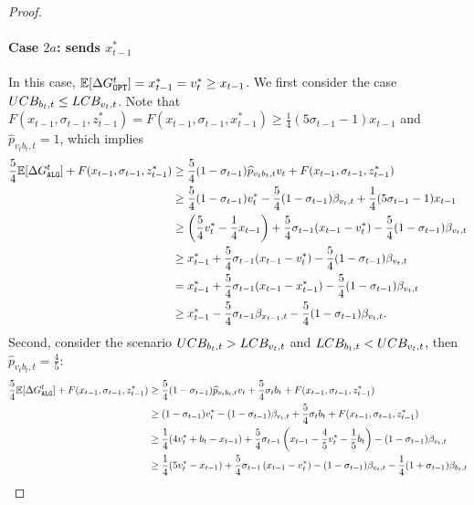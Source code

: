 \begin{proof}
    \paragraph{Case $2a$: \opt sends $x_{t-1}^*$}
    In this case, $\mathbb{E}[\Delta \Gopt^t] = x_{t-1}^* = v_t^* \ge x_{t-1}$. We first consider the case $UCB_{b_t, t} \le LCB_{v_{t},t}$. Note that $F(x_{t-1}, \sigma_{t-1}, z_{t-1}^*) = F(x_{t-1}, \sigma_{t-1}, x_{t-1}^*) \ge \frac{1}{4}(5\sigma_{t-1}-1)x_{t-1}$ and $\widehat{p}_{v_{t} b_t, t} = 1$, which implies
    \begin{align*}
        \frac{5}{4}\mathbb{E}[\Delta \Galg^t] + F(x_{t-1}, \sigma_{t-1}, z_{t-1}^*) &\ge \frac{5}{4}(1-\sigma_{t-1})\widehat{p}_{v_{t} b_t, t}v_{t} + F(x_{t-1}, \sigma_{t-1}, z_{t-1}^*) \\
        &\ge \frac{5}{4}(1-\sigma_{t-1})v_{t}^*- \frac{5}{4}(1-\sigma_{t-1})\beta_{v_t, t}+ \frac{1}{4}(5\sigma_{t-1}-1)x_{t-1} \\
        &\ge \left(\frac{5}{4}v_{t}^*-\frac{1}{4}x_{t-1}\right)+ \frac{5}{4}\sigma_{t-1}(x_{t-1}-v_t^*) - \frac{5}{4}(1-\sigma_{t-1})\beta_{v_t, t}\\
        &\ge x_{t-1}^*+ \frac{5}{4}\sigma_{t-1}(x_{t-1}-v_t^*) - \frac{5}{4}(1-\sigma_{t-1})\beta_{v_t, t}\\
        &= x_{t-1}^*+ \frac{5}{4}\sigma_{t-1}(x_{t-1}-x_{t-1}^*) - \frac{5}{4}(1-\sigma_{t-1})\beta_{v_t, t}\\
        &\ge x_{t-1}^*- \frac{5}{4}\sigma_{t-1}\beta_{x_{t-1},t}- \frac{5}{4}(1-\sigma_{t-1})\beta_{v_t, t}.
    \end{align*}
    Second, consider the scenario $UCB_{b_t, t} > LCB_{v_{t},t}$ and $LCB_{b_t, t} < UCB_{v_{t},t}$, then $\widehat{p}_{v_t b_t, t} = \frac{4}{5}$:
    \begin{align*}
        \frac{5}{4}\mathbb{E}[\Delta \Galg^t] +F(x_{t-1}, \sigma_{t-1}, z_{t-1}^*)&\ge \frac{5}{4}(1-\sigma_{t-1})\widehat{p}_{v_t b_t, t}v_{t} + \frac{5}{4}\sigma_t b_t+ F(x_{t-1}, \sigma_{t-1}, z_{t-1}^*) \\
        &\ge (1-\sigma_{t-1})v_{t}^*- (1-\sigma_{t-1})\beta_{v_t,t}+\frac{5}{4}\sigma_t b_t+ F(x_{t-1}, \sigma_{t-1}, z_{t-1}^*) \\
        &\ge \frac{1}{4}(4v_{t}^*+b_t-x_{t-1}) + \frac{5}{4}\sigma_{t-1}\left(x_{t-1}-\frac{4}{5}v_{t}^*-\frac{1}{5}b_t\right) - (1-\sigma_{t-1})\beta_{v_t,t}\\
        &\ge \frac{1}{4}(5v_{t}^*-x_{t-1}) + \frac{5}{4}\sigma_{t-1}\left(x_{t-1}-v_{t}^*\right) - (1-\sigma_{t-1})\beta_{v_t,t}- \frac{1}{4}(1+\sigma_{t-1})\betab\\

\end{align*}
\end{proof}
